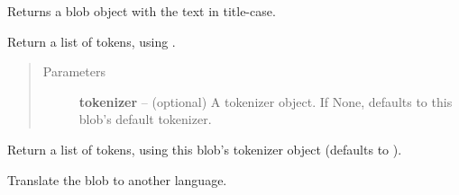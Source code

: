 \documentclass[letterpaper,10pt,english]{sphinxmanual}
\begin{document}
\begin{fulllineitems}
\begin{fulllineitems}
\begin{quote}
\begin{description}
\end{description}\end{quote}

\end{fulllineitems}


\begin{fulllineitems}
\label{api_reference:textblob_de.blob.Sentence.title}
Returns a blob object with the text in title-case.

\end{fulllineitems}


\begin{fulllineitems}
\label{api_reference:textblob_de.blob.Sentence.tokenize}
Return a list of tokens, using .
\begin{quote}\begin{description}
\item[{Parameters}] \leavevmode
\textbf{tokenizer} -- (optional) A tokenizer object. If None, defaults to
this blob's default tokenizer.

\end{description}\end{quote}

\end{fulllineitems}


\begin{fulllineitems}
\label{api_reference:textblob_de.blob.Sentence.tokens}
Return a list of tokens, using this blob's tokenizer object
(defaults to ).

\end{fulllineitems}


\begin{fulllineitems}
\label{api_reference:textblob_de.blob.Sentence.translate}
Translate the blob to another language.

\end{fulllineitems}


\end{fulllineitems}
\end{document}
